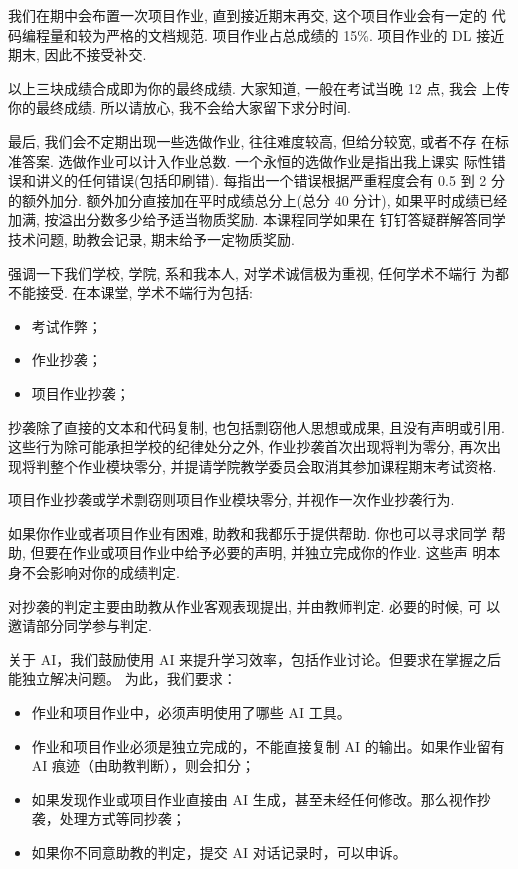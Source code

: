 \documentclass[a4paper]{ctexart}
\numberwithin{theorem}{section}
\numberwithin{equation}{section}
\numberwithin{figure}{section}
\numberwithin{remark}{section}
\begin{document}
我们在期中会布置一次项目作业, 直到接近期末再交, 这个项目作业会有一定的
代码编程量和较为严格的文档规范. 项目作业占总成绩的 15\%. 项目作业的 DL
接近期末, 因此不接受补交. 

以上三块成绩合成即为你的最终成绩. 大家知道, 一般在考试当晚 12 点, 我会
上传你的最终成绩. 所以请放心, 我不会给大家留下求分时间.

最后, 我们会不定期出现一些选做作业, 往往难度较高, 但给分较宽, 或者不存
在标准答案. 选做作业可以计入作业总数. 一个永恒的选做作业是指出我上课实
际性错误和讲义的任何错误(包括印刷错). 每指出一个错误根据严重程度会有
0.5 到 2 分的额外加分. 额外加分直接加在平时成绩总分上(总分 40 分计),
如果平时成绩已经加满, 按溢出分数多少给予适当物质奖励. 本课程同学如果在
钉钉答疑群解答同学技术问题, 助教会记录, 期末给予一定物质奖励.

强调一下我们学校, 学院, 系和我本人, 对学术诚信极为重视, 任何学术不端行
为都不能接受. 在本课堂, 学术不端行为包括:

\begin{itemize}
\item 考试作弊；
\item 作业抄袭；
\item 项目作业抄袭；
\end{itemize}

抄袭除了直接的文本和代码复制, 也包括剽窃他人思想或成果, 
且没有声明或引用. 这些行为除可能承担学校的纪律处分之外, 
作业抄袭首次出现将判为零分, 再次出现将判整个作业模块零分, 
并提请学院教学委员会取消其参加课程期末考试资格.

项目作业抄袭或学术剽窃则项目作业模块零分, 并视作一次作业抄袭行为.

如果你作业或者项目作业有困难, 助教和我都乐于提供帮助. 你也可以寻求同学
帮助, 但要在作业或项目作业中给予必要的声明, 并独立完成你的作业. 这些声
明本身不会影响对你的成绩判定.

对抄袭的判定主要由助教从作业客观表现提出, 并由教师判定. 必要的时候, 可
以邀请部分同学参与判定. %

关于 AI，我们鼓励使用 AI 来提升学习效率，包括作业讨论。但要求在掌握之后能独立解决问题。
为此，我们要求：
\begin{itemize}
  \item 作业和项目作业中，必须声明使用了哪些 AI 工具。
  \item 作业和项目作业必须是独立完成的，不能直接复制 AI 的输出。如果作业留有 AI 痕迹（由助教判断），则会扣分；
  \item 如果发现作业或项目作业直接由 AI 生成，甚至未经任何修改。那么视作抄袭，处理方式等同抄袭；
  \item 如果你不同意助教的判定，提交 AI 对话记录时，可以申诉。
\end{itemize}
\end{document}
